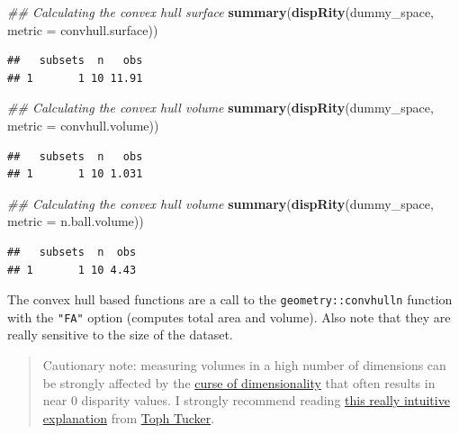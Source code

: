 \documentclass[
]{book}
\newenvironment{Shaded}{\begin{snugshade}}{\end{snugshade}}
\newcommand{\CommentTok}[1]{\textcolor[rgb]{0.56,0.35,0.01}{\textit{#1}}}
\newcommand{\DataTypeTok}[1]{\textcolor[rgb]{0.13,0.29,0.53}{#1}}
\newcommand{\KeywordTok}[1]{\textcolor[rgb]{0.13,0.29,0.53}{\textbf{#1}}}
\newcommand{\NormalTok}[1]{#1}
\begin{document}
\begin{Shaded}
\begin{Highlighting}[]
\CommentTok{\#\# Calculating the convex hull surface}
\KeywordTok{summary}\NormalTok{(}\KeywordTok{dispRity}\NormalTok{(dummy\_space, }\DataTypeTok{metric =}\NormalTok{ convhull.surface))}
\end{Highlighting}
\end{Shaded}

\begin{verbatim}
##   subsets  n   obs
## 1       1 10 11.91
\end{verbatim}

\begin{Shaded}
\begin{Highlighting}[]
\CommentTok{\#\# Calculating the convex hull volume}
\KeywordTok{summary}\NormalTok{(}\KeywordTok{dispRity}\NormalTok{(dummy\_space, }\DataTypeTok{metric =}\NormalTok{ convhull.volume))}
\end{Highlighting}
\end{Shaded}

\begin{verbatim}
##   subsets  n   obs
## 1       1 10 1.031
\end{verbatim}

\begin{Shaded}
\begin{Highlighting}[]
\CommentTok{\#\# Calculating the convex hull volume}
\KeywordTok{summary}\NormalTok{(}\KeywordTok{dispRity}\NormalTok{(dummy\_space, }\DataTypeTok{metric =}\NormalTok{ n.ball.volume))}
\end{Highlighting}
\end{Shaded}

\begin{verbatim}
##   subsets  n  obs
## 1       1 10 4.43
\end{verbatim}

The convex hull based functions are a call to the \texttt{geometry::convhulln} function with the \texttt{"FA"} option (computes total area and volume).
Also note that they are really sensitive to the size of the dataset.

\begin{quote}
Cautionary note: measuring volumes in a high number of dimensions can be strongly affected by the \href{https://en.wikipedia.org/wiki/Curse_of_dimensionality}{curse of dimensionality} that often results in near 0 disparity values. I strongly recommend reading \href{https://beta.observablehq.com/@tophtucker/theres-plenty-of-room-in-the-corners}{this really intuitive explanation} from \href{https://github.com/tophtucker}{Toph Tucker}.
\end{quote}
\end{document}

